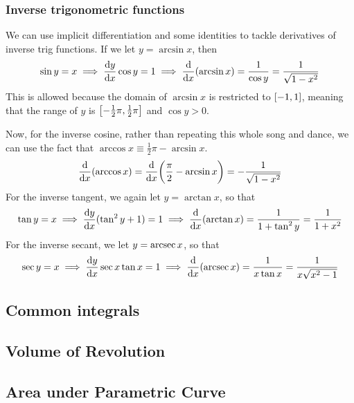 \documentclass[fleqn,a4paper,11pt]{article}
\begin{document}
    \subsubsection{Inverse trigonometric functions} \label{sec_calc_trig_inv}

    We can use implicit differentiation and some identities to tackle
    derivatives of inverse trig functions. If we let \(y = \arcsin x\), then
    \begin{equation*}
    \sin y = x \implies \dv{y}{x} \cos y = 1
        \implies \dv{x}(\arcsin x) = \frac{1}{\cos y} = \frac{1}{\sqrt{1 - x^2}}
    \end{equation*}
    This is allowed because the domain of \(\arcsin x\) is restricted to
    \(\intcc{-1, 1}\), meaning that the range of \(y\) is
    \(\intcc{-\frac 12 \pi, \frac 12 \pi}\) and \(\cos y > 0\).

    Now, for the inverse cosine, rather than repeating this whole song and
    dance, we can use the fact that
    \(\arccos x \equiv \frac 12 \pi - \arcsin x\).
    \begin{equation*}
    \dv{x}(\arccos x) = \dv{x}(\frac \pi 2 - \arcsin x)
        = -\frac 1{\sqrt{1 - x^2}}
    \end{equation*}
    For the inverse tangent, we again let \(y = \arctan x\), so that
    \begin{equation*}
    \tan y = x \implies \dv{y}{x} {(\tan^2 y + 1)} = 1
        \implies \dv{x}(\arctan x) = \frac 1{1 + \tan^2 y}
            = \frac 1{1 + x^2}
    \end{equation*}
    For the inverse secant, we let \(y = \arcsec x\), so that
    \begin{equation*}
    \sec y = x \implies \dv{y}{x} \sec x \tan x = 1
        \implies \dv{x}(\arcsec x) = \frac 1{x \tan x}
            = \frac 1{x \sqrt{x^2 - 1}}
    \end{equation*}

    \subsection{Common integrals}

    \subsection{Volume of Revolution}

    \subsection{Area under Parametric Curve} \label{sec_calc_parametric_area}
\end{document}
